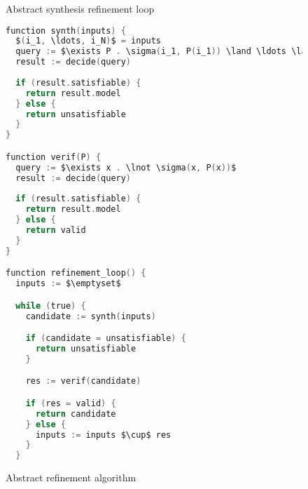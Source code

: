 \documentclass[a4paper]{llncs}
\begin{document}
\begin{figure}
 \centering

 \label{fig:abstract-refinement}
 \caption{Abstract synthesis refinement loop}
\end{figure}

\begin{figure}
\centering
\begin{minipage}{0.9\textwidth}
 \begin{lstlisting}[mathescape,language=C]
function synth(inputs) {
  $(i_1, \ldots, i_N)$ = inputs
  query := $\exists P . \sigma(i_1, P(i_1)) \land \ldots \land \sigma(i_N, P(i_N))$
  result := decide(query)
  
  if (result.satisfiable) {
    return result.model
  } else {
    return unsatisfiable
  }
}

function verif(P) {
  query := $\exists x . \lnot \sigma(x, P(x))$
  result := decide(query)
  
  if (result.satisfiable) {
    return result.model
  } else {
    return valid
  }
}

function refinement_loop() {
  inputs := $\emptyset$

  while (true) {
    candidate := synth(inputs)

    if (candidate = unsatisfiable) {
      return unsatisfiable
    }

    res := verif(candidate)

    if (res = valid) {
      return candidate
    } else {
      inputs := inputs $\cup$ res
    }
  }
 \end{lstlisting}
 \end{minipage}

 \label{fig:abstract-refinement-code}
 \caption{Abstract refinement algorithm}
\end{figure}
\end{document}
